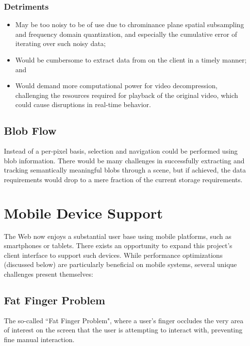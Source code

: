 \subsubsection{Detriments}
\begin{itemize}
\item May be too noisy to be of use due to chrominance plane spatial subsampling and frequency domain quantization, and especially the cumulative error of iterating over such noisy data;
\item Would be cumbersome to extract data from on the client in a timely manner; and
\item Would demand more computational power for video decompression, challenging the resources required for playback of the original video, which could cause disruptions in real-time behavior.
\end{itemize}

\subsection{Blob Flow}
Instead of a per-pixel basis, selection and navigation could be performed using blob information. There would be many challenges in successfully extracting and tracking semantically meaningful blobs through a scene, but if achieved, the data requirements would drop to a mere fraction of the current storage requirements.


\section{Mobile Device Support}
The Web now enjoys a substantial user base using mobile platforms, such as smartphones or tablets. There exists an opportunity to expand this project's client interface to support such devices. While performance optimizations (discussed below) are particularly beneficial on mobile systems, several unique challenges present themselves:


\subsection{Fat Finger Problem}
    The so-called ``Fat Finger Problem", where a user's finger occludes the very area of interest on the screen that the user is attempting to interact with, preventing fine manual interaction.\cite{fatfinger}

